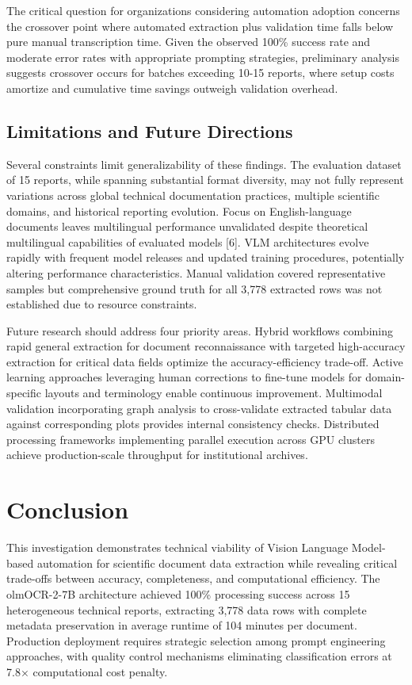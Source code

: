 \documentclass{svproc}
\begin{document}
The critical question for organizations considering automation adoption concerns the crossover point where automated extraction plus validation time falls below pure manual transcription time. Given the observed 100\% success rate and moderate error rates with appropriate prompting strategies, preliminary analysis suggests crossover occurs for batches exceeding 10-15 reports, where setup costs amortize and cumulative time savings outweigh validation overhead.

\subsection{Limitations and Future Directions}

Several constraints limit generalizability of these findings. The evaluation dataset of 15 reports, while spanning substantial format diversity, may not fully represent variations across global technical documentation practices, multiple scientific domains, and historical reporting evolution. Focus on English-language documents leaves multilingual performance unvalidated despite theoretical multilingual capabilities of evaluated models [6]. VLM architectures evolve rapidly with frequent model releases and updated training procedures, potentially altering performance characteristics. Manual validation covered representative samples but comprehensive ground truth for all 3,778 extracted rows was not established due to resource constraints.

Future research should address four priority areas. Hybrid workflows combining rapid general extraction for document reconnaissance with targeted high-accuracy extraction for critical data fields optimize the accuracy-efficiency trade-off. Active learning approaches leveraging human corrections to fine-tune models for domain-specific layouts and terminology enable continuous improvement. Multimodal validation incorporating graph analysis to cross-validate extracted tabular data against corresponding plots provides internal consistency checks. Distributed processing frameworks implementing parallel execution across GPU clusters achieve production-scale throughput for institutional archives.

\section{Conclusion}

This investigation demonstrates technical viability of Vision Language Model-based automation for scientific document data extraction while revealing critical trade-offs between accuracy, completeness, and computational efficiency. The olmOCR-2-7B architecture achieved 100\% processing success across 15 heterogeneous technical reports, extracting 3,778 data rows with complete metadata preservation in average runtime of 104 minutes per document. Production deployment requires strategic selection among prompt engineering approaches, with quality control mechanisms eliminating classification errors at 7.8× computational cost penalty.
\end{document}
